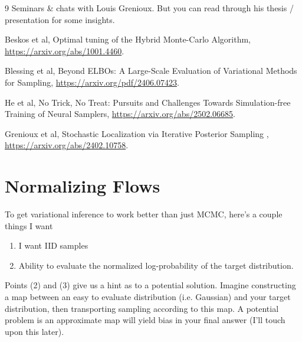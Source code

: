 \begin{thebibliography}{9}
Seminars \& chats with Louis Grenioux. But you can read through his thesis / presentation for some insights.

Beskos et al, Optimal tuning of the Hybrid Monte-Carlo Algorithm, \url{https://arxiv.org/abs/1001.4460}.

Blessing et al, Beyond ELBOs: A Large-Scale Evaluation of Variational Methods for Sampling, \url{https://arxiv.org/pdf/2406.07423}.

He et al, No Trick, No Treat: Pursuits and Challenges Towards Simulation-free Training of Neural Samplers, \url{https://arxiv.org/abs/2502.06685}.

Grenioux et al, Stochastic Localization via Iterative Posterior Sampling
, \url{https://arxiv.org/abs/2402.10758}.


\end{thebibliography}





\newpage
\section{Normalizing Flows}
To get variational inference to work better than just MCMC, here's a couple things I want
\begin{enumerate}
	\item I want IID samples
	\item Ability to evaluate the normalized log-probability of the target distribution.
\end{enumerate}
Points (2) and (3) give us a hint as to a potential solution. Imagine constructing a map between an easy to evaluate distribution (i.e. Gaussian) and your target distribution, then transporting sampling according to this map. A potential problem is an approximate map will yield bias in your final answer (I'll touch upon this later).

